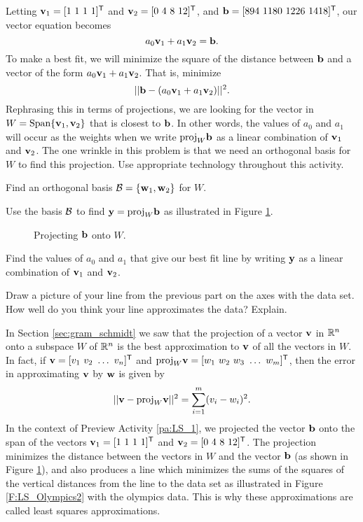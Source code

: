 \begin{pa}
Letting $\vv_1 = [1 \ 1 \ 1 \ 1]^{\tr}$ and $\vv_2 = [0 \ 4 \ 8 \ 12]^{\tr}$, and $\vb = [894 \ 1180 \ 1226 \ 1418]^{\tr}$, our vector equation becomes
\[a_0 \mathbf{v}_1 + a_1\mathbf{v}_2 = \mathbf{b}.\]
To make a best fit, we will minimize the square of the distance between $\mathbf{b}$ and a vector of the form $a_0\mathbf{v}_1 + a_1 \mathbf{v}_2$. That is, minimize
\begin{equation} \label{eq:LS_line_1} 
||\mathbf{b} - (a_0 \mathbf{v}_1 + a_1\mathbf{v}_2)||^2.
\end{equation} 
Rephrasing this in terms of projections, we are looking for the vector in $W = \text{Span}\{\mathbf{v}_1, \mathbf{v}_2\}$ that is closest to $\mathbf{b}$.  In other words, the values of $a_0$ and $a_1$ will occur as the weights when we write $\text{proj}_{W} \mathbf{b}$ as a linear combination of $\mathbf{v}_1$ and $\mathbf{v}_2$. The one wrinkle in this problem is that we need an orthogonal basis for $W$ to find this projection. Use appropriate technology throughout this activity. 

\be
\item Find an orthogonal basis $\mathcal{B} = \{\mathbf{w}_1, \mathbf{w}_2\}$ for $W$. 

\item Use the basis $\mathcal{B}$ to find $\mathbf{y} = \text{proj}_{W} \mathbf{b}$ as illustrated in Figure \ref{F:6_f_proj}.
\begin{figure}[h]
    \begin{center}
    \caption{Projecting $\mathbf{b}$ onto $W$.}
    \label{F:6_f_proj}
    \end{center}
    \end{figure} 

\item Find the values of $a_0$ and $a_1$ that give our best fit line by writing $\mathbf{y}$ as a linear combination of $\mathbf{v}_1$ and $\mathbf{v}_2$. 

\item Draw a picture of your line from the previous part on the axes with the data set. How well do you think your line approximates the data? Explain. 
	
\ee

\end{pa}

 \label{sec:ls_approx}
 
In Section \ref{sec:gram_schmidt} we saw that the projection of a vector $\mathbf{v}$ in $\mathbb{R}^n$ onto a subspace $W$ of $\mathbb{R}^n$ is the best approximation to $\mathbf{v}$ of all the vectors in $W$. In fact, if $\vv = [v_1 \ v_2 \ \ldots \ v_n]^{\tr}$ and $\proj_W \vv =  [w_1 \ w_2 \ w_3 \ \ldots \ w_m]^{\tr}$, then the error in approximating $\mathbf{v}$ by $\mathbf{w}$ is given by 
\[|| \mathbf{v} - \text{proj}_W \mathbf{v} ||^2 = \sum_{i=1}^m (v_i - w_i)^2.\]
In the context of Preview Activity \ref{pa:LS_1}, we projected the vector $\mathbf{b}$ onto the span of the vectors $\vv_1 = [1 \ 1 \ 1 \ 1]^{\tr}$ and $\vv_2 = [0 \ 4 \ 8 \ 12]^{\tr}$. The projection minimizes the distance between the vectors in $W$ and the vector $\mathbf{b}$ (as shown in Figure \ref{F:6_f_proj}), and also produces a line which minimizes the sums of the squares of the vertical distances from the line to the data set as illustrated in Figure \ref{F:LS_Olympics2} with the olympics data. This is why these approximations are called least squares approximations. 

